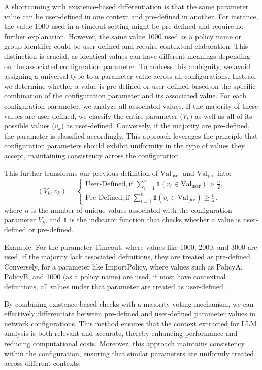  A shortcoming with existence-based differentiation is that the same parameter value can be user-defined in one context and pre-defined in another. For instance, the value 1000 used in a timeout setting might be pre-defined and require no further explanation. However, the same value 1000 used as a policy name or group identifier could be user-defined and require contextual elaboration. This distinction is crucial, as identical values can have different meanings depending on the associated configuration parameter. To address this ambiguity, we avoid assigning a universal type to a parameter value across all configurations. Instead, we determine whether a value is pre-defined or user-defined based on the specific combination of the configuration parameter and its associated value. For each configuration parameter, we analyze all associated values. If the majority of these values are user-defined, we classify the entire parameter (\(V_k\)) as well as all of its possible values (\(v_k\)) as user-defined. Conversely, if the majority are pre-defined, the parameter is classified accordingly. This approach leverages the principle that configuration parameters should exhibit uniformity in the type of values they accept, maintaining consistency across the configuration.

This further transforms our previous definition of \( \text{Val}_{\text{user}} \)  and \( \text{Val}_{\text{pre}} \)  into:
\[
(V_k, v_k) = 
\begin{cases} 
\text{User-Defined}, \text{if } \sum_{i=1}^{n} \mathbb{1}(v_i \in \text{Val}_{\text{user}}) > \frac{n}{2}, \\
\text{Pre-Defined}, \text{if } \sum_{i=1}^{n} \mathbb{1}(v_i \in \text{Val}_{\text{pre}}) \geq \frac{n}{2}.
\end{cases}
\]
where \( n \) is the number of unique values associated with the configuration parameter \( V_k \), and \( \mathbb{1} \) is the indicator function that checks whether a value is user-defined or pre-defined.


Example: For the parameter Timeout, where values like 1000, 2000, and 3000 are used, if the majority lack associated definitions, they are treated as pre-defined. Conversely, for a parameter like ImportPolicy, where values such as PolicyA, PolicyB, and 1000 (as a policy name) are used, if most have contextual definitions, all values under that parameter are treated as user-defined.


By combining existence-based checks with a majority-voting mechanism, we can effectively differentiate between pre-defined and user-defined parameter values in network configurations. This method ensures that the context extracted for LLM analysis is both relevant and accurate, thereby enhancing performance and reducing computational costs. Moreover, this approach maintains consistency within the configuration, ensuring that similar parameters are uniformly treated across different contexts.


